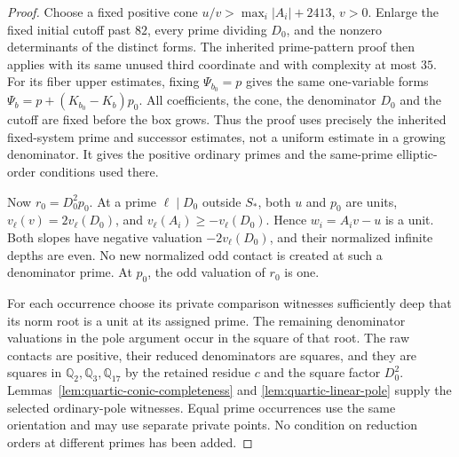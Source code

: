\documentclass[11pt]{article}
\theoremstyle{definition}
\theoremstyle{remark}
\newcommand{\Q}{\mathbb Q}
\begin{document}
\begin{proof}
Choose a fixed positive cone
$u/v>\max_i|A_i|+2413$, $v>0$. Enlarge the fixed initial cutoff past
$82$, every prime dividing $D_0$, and the nonzero determinants of the
distinct forms. The inherited prime-pattern proof then applies with its
same unused third coordinate and with complexity at most $35$.
For its fiber upper estimates, fixing $\Psi_{b_0}=p$ gives the same
one-variable forms
$\Psi_b=p+(K_{b_0}-K_b)p_0$.
All coefficients, the cone, the denominator $D_0$ and the cutoff are
fixed before the box grows. Thus the proof uses precisely the inherited
fixed-system prime and successor estimates, not a uniform estimate in a
growing denominator. It gives the positive ordinary primes and the
same-prime elliptic-order conditions used there.

Now $r_0=D_0^2p_0$. At a prime $\ell\mid D_0$ outside $S_*$, both $u$
and $p_0$ are units, $v_\ell(v)=2v_\ell(D_0)$, and
$v_\ell(A_i)\ge-v_\ell(D_0)$. Hence $w_i=A_iv-u$ is a unit.
Both slopes have negative valuation $-2v_\ell(D_0)$, and their normalized
infinite depths are even. No new normalized odd contact is created at
such a denominator prime. At $p_0$, the odd valuation of $r_0$ is one.

For each occurrence choose its private comparison witnesses sufficiently
deep that its norm root is a unit at its assigned prime. The remaining
denominator valuations in the pole argument occur in the square of that
root. The raw contacts are positive, their reduced denominators are
squares, and they are squares in $\Q_2,\Q_3,\Q_{17}$ by the retained
residue $c$ and the square factor $D_0^2$.
Lemmas~\ref{lem:quartic-conic-completeness} and
\ref{lem:quartic-linear-pole} supply the selected ordinary-pole witnesses. Equal prime occurrences use the
same orientation and may use separate private points. No condition on
reduction orders at different primes has been added.
\end{proof}
\end{document}
